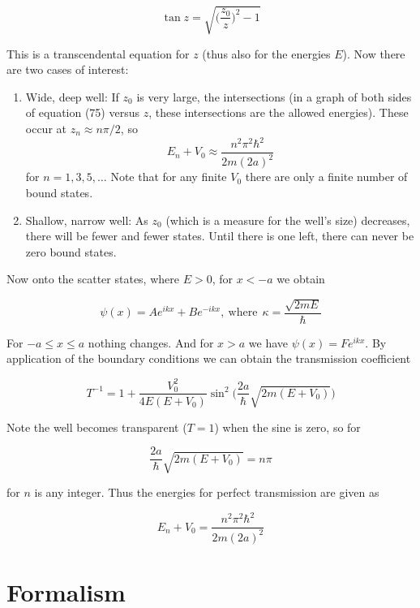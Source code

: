 \documentclass[a4paper]{article}
\begin{document}
\begin{equation}
	\tan z = \sqrt{\bigg(\frac{z_0}{z}\bigg)^2-1}
\end{equation}

This is a transcendental equation for $z$ (thus also for the energies $E$). Now there are two cases of interest:

\begin{enumerate}
	\item Wide, deep well: If $z_0$ is very large, the intersections (in a graph of both sides of equation (75) versus $z$, these intersections are the allowed energies). These occur at $z_n\approx n\pi/2$, so $$E_n+V_0\approx\frac{n^2\pi^2\hbar^2}{2m(2a)^2}$$ for $n=1,3,5,\dots$ Note that for any finite $V_0$ there are only a finite number of bound states.
	\item Shallow, narrow well: As $z_0$ (which is a measure for the well's size) decreases, there will be fewer and fewer states. Until there is one left, there can never be zero bound states.  
\end{enumerate}

Now onto the scatter states, where $E>0$, for $x<-a$ we obtain

\begin{equation}
	\psi(x)=Ae^{ikx}+Be^{-ikx}, \ \text{where}\ \ \kappa=\frac{\sqrt{2mE}}{\hbar}
\end{equation}

For $-a\le x\le a$ nothing changes. And for $x>a$ we have $\psi(x)=Fe^{ikx}$. By application of the boundary conditions we can obtain the transmission coefficient

\begin{equation}
	T^{-1} = 1+\frac{V_0^2}{4E(E+V_0)}\sin^2\bigg(\frac{2a}{\hbar}\sqrt{2m(E+V_0)}\bigg)
\end{equation}

Note the well becomes transparent ($T=1$) when the sine is zero, so for

\begin{equation}
	\frac{2a}{\hbar}\sqrt{2m(E+V_0)}=n\pi
\end{equation}

for $n$ is any integer. Thus the energies for perfect transmission are given as

\begin{equation}
	E_n+V_0=\frac{n^2\pi^2\hbar^2}{2m(2a)^2}
\end{equation}

\section{Formalism}
\end{document}
